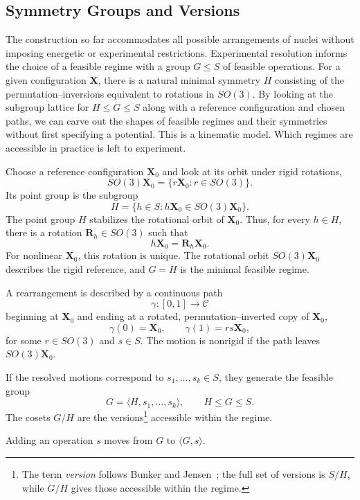 \documentclass[11pt]{article}
\newcommand{\conf}{\mathcal{C}}
\newcommand{\X}{\mathbf{X}}
\newcommand{\Rmat}{\mathbf{R}}
\begin{document}
\subsection{Symmetry Groups and Versions}
\label{sec:groups-versions}

The construction so far accommodates all possible
arrangements of nuclei without imposing energetic or
experimental restrictions. Experimental resolution informs the choice of a feasible
regime with a group $G\leq S$ of feasible operations. For a given configuration $\X$,
there is a natural minimal symmetry $H$ consisting of the
permutation--inversions equivalent to rotations in $SO(3)$. By looking at the subgroup lattice for $H\leq
G\leq S$ along with a reference configuration and chosen paths,
we can carve out the shapes of feasible regimes and
their symmetries without first specifying a potential.
This is a kinematic model. Which
regimes are accessible in practice is left to experiment.

Choose a reference configuration $\X_0$ and look at its orbit
under rigid rotations,
\[
SO(3)\X_0=\{r\X_0:r\in SO(3)\}.
\]
Its point group is the subgroup
\[
H
=
\{h\in S:h\X_0\in SO(3)\X_0\}.
\]
The point group $H$ stabilizes the rotational orbit of $\X_0$.
Thus, for every $h\in H$, there is a rotation $\Rmat_h\in SO(3)$
such that
\[
h\X_0=\Rmat_h\X_0.
\]
For nonlinear $\X_0$, this rotation is unique. The rotational
orbit $SO(3)\X_0$ describes the rigid reference, and $G=H$ is
the minimal feasible regime.

A rearrangement is described by a continuous path
\[
\gamma:[0,1]\to\conf
\]
beginning at $\X_0$ and ending at a rotated,
permutation--inverted copy of $\X_0$,
\[
\gamma(0)=\X_0,
\qquad
\gamma(1)=rs\X_0,
\]
for some $r\in SO(3)$ and $s\in S$. The motion is
nonrigid if the path leaves $SO(3)\X_0$.

If the resolved motions correspond to
$s_1,\ldots,s_k\in S$, they generate the feasible group
\[
G=\langle H,s_1,\ldots,s_k\rangle,
\qquad
H\leq G\leq S.
\]
The cosets $G/H$ are the versions\footnote{The term
\emph{version} follows Bunker and Jensen~\cite{BunkerJensen1998}; the full set of versions is $S/H$,
while $G/H$ gives those accessible within the regime.}
accessible within the regime.

Adding an operation $s$ moves from $G$ to $\langle G,s\rangle$.
\end{document}
